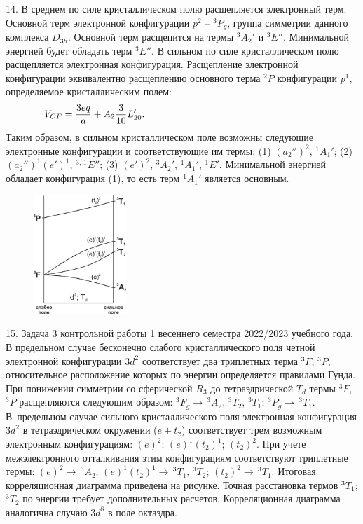 14. В среднем по силе кристаллическом полю расщепляется электронный терм. Основной терм электронной конфигурации $p^2$ – $^3P_g$, группа симметрии данного комплекса $D_{3h}$. Основной терм расщепится на термы $^3A_2'$ и $^3E''$. Минимальной энергией будет обладать терм $^3E''$.  В сильном по силе кристаллическом полю расщепляется электронная конфигурация. Расщепление электронной конфигурации эквивалентно расщеплению основного терма $^2P$ конфигурации $p^1$, определяемое кристаллическим полем:
\begin{equation*}
\begin{aligned}
& V_{CF}= \dfrac{3eq}{a} + A_2\dfrac{3}{10}L_{20}'. \hspace{60mm}
\end{aligned}
\end{equation*}
Таким образом, в сильном кристаллическом поле возможны следующие электронные конфигурации и соответствующие им термы: (1) $(a_2'')^2$, $^1A_1'$; (2) $(a_2'')^1(e')^1$, $^{3,\,1}E''$; (3) $(e')^2$, $^3A_2'$, $^1A_1'$, $^1E'$. Минимальной энергией обладает конфигурация (1), то есть терм $^1A_1'$ является основным.\par
\begin{figure} %
    \centering
    \vspace{-3.8mm}
    \includegraphics[width=35mm]{images/Fig_2_2_15_dec.png}
    \vspace{-2mm}
\end{figure}
15. Задача 3 контрольной работы 1 весеннего семестра 2022/2023 учебного года. В предельном случае бесконечно слабого кристаллического поля четной электронной конфигурации $3d^2$ соответствует два триплетных терма $^3F$, $^3P$, относительное расположение которых по энергии определяется правилами Гунда. При понижении симметрии со сферической $R_3$ до тетраэдрической $T_d$ термы $^3F$, $^3P$ расщепляются следующим образом: $^3F_g \rightarrow \,^3A_2,\,^3T_2,\,^3T_1$; $^3P_g  \rightarrow\,^3T_1$. В~предельном случае сильного кристаллического поля электронная конфигурация $3d^2$ в тетраэдрическом окружении ($e + t_2$) соответствует трем возможным электронным конфигурациям: $(e)^2$; $(e)^1(t_2 )^1$; $(t_2 )^2$. При учете межэлектронного отталкивания этим конфигурациям соответствуют триплетные термы: $(e)^2  \rightarrow \,^3A_2$;  $(e)^1 (t_2 )^1  \rightarrow \,^3T_1,\,^3T_2$; $(t_2 )^2  \rightarrow \,^3T_1$. Итоговая корреляционная диаграмма приведена на рисунке. Точная расстановка термов $^3T_1$; $^3T_2$ по энергии требует дополнительных расчетов. Корреляционная диаграмма аналогична случаю $3d^8$ в поле октаэдра.\par
\newpage

